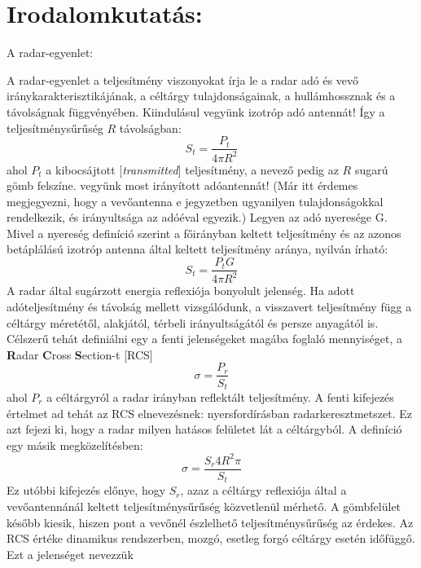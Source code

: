 \documentclass{article}
\begin{document}
\section{Irodalomkutatás:}
    
A radar-egyenlet:

A radar-egyenlet a teljesítmény viszonyokat írja le a radar adó és vevő iránykarakterisztikájának, a céltárgy
tulajdonságainak, a hullámhossznak és a távolságnak függvényében.
Kiindulásul vegyünk izotróp adó antennát! Így a teljesítménysűrűség $R$ távolságban:
    \begin{equation}
        S_t=\frac{P_t}{4 \pi R^2}
    \end{equation}
ahol $P_t$ a kibocsájtott [\emph{transmitted}] teljesítmény, a nevező pedig az $R$ sugarú gömb felszíne.\newline
\quad vegyünk most irányított adóantennát! (Már itt érdemes megjegyezni, hogy a vevőantenna e jegyzetben ugyanilyen tulajdonságokkal
rendelkezik, és irányultsága az adóéval egyezik.) Legyen az adó nyeresége G. Mivel a nyereség definíció szerint a
főirányban keltett teljesítmény és az azonos betáplálású izotróp antenna által keltett teljesítmény aránya, nyilván
írható:
    \begin{equation}
        S_t=\frac{P_t G}{4 \pi R^2}
    \end{equation}
A radar által sugárzott energia reflexiója bonyolult jelenség. Ha adott adóteljesítmény és távolság mellett vizsgálódunk,
a visszavert teljesítmény függ a céltárgy méretétől, alakjától, térbeli irányultságától és persze anyagától is. Célszerű
tehát definiálni egy a fenti jelenségeket magába foglaló mennyiséget, a \textbf{R}adar \textbf{C}ross \textbf{S}ection-t [RCS]
    \begin{equation}
        \sigma=\frac{P_r}{S_t}
    \end{equation}
ahol $P_r$ a céltárgyról a radar irányban reflektált teljesítmény. A fenti kifejezés értelmet ad tehát az RCS elnevezésnek: nyersfordírásban
radarkeresztmetszet. Ez azt fejezi ki, hogy a radar milyen hatásos felületet lát a céltárgyból.
A definíció egy másik megközelítésben:
    \begin{equation}
        \sigma=\frac{S_r 4 R^2 \pi}{S_t}
    \end{equation}
Ez utóbbi kifejezés előnye, hogy $S_r$, azaz a céltárgy reflexiója által a vevőantennánál keltett teljesítménysűrűség közvetlenül mérhető.
A gömbfelület később kiesik, hiszen pont a vevőnél észlelhető teljesítménysűrűség az érdekes.
\quad Az RCS értéke dinamikus rendszerben, mozgó, esetleg forgó céltárgy esetén időfüggő. Ezt a jelenséget nevezzük
\end{document}
